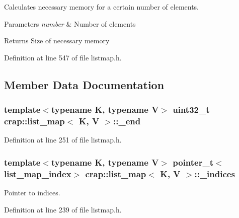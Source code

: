 Calculates necessary memory for a certain number of elements. 


\begin{DoxyParams}{Parameters}
{\em number} & Number of elements \\
\hline
\end{DoxyParams}
\begin{DoxyReturn}{Returns}
Size of necessary memory 
\end{DoxyReturn}


Definition at line 547 of file listmap.\+h.



\subsection{Member Data Documentation}
\hypertarget{classcrap_1_1list__map_afa98ab282df5241b186bba9087f694cf}{
\subsubsection[{\+\_\+end}]{\setlength{\rightskip}{0pt plus 5cm}template$<$typename K, typename V$>$ uint32\+\_\+t {\bf crap\+::list\+\_\+map}$<$ K, V $>$\+::\+\_\+end\hspace{0.3cm}{\ttfamily [protected]}}}\label{classcrap_1_1list__map_afa98ab282df5241b186bba9087f694cf}


Definition at line 251 of file listmap.\+h.

\hypertarget{classcrap_1_1list__map_a3adb0e770ab21d2634db1fd04afffb27}{
\subsubsection[{\+\_\+indices}]{\setlength{\rightskip}{0pt plus 5cm}template$<$typename K, typename V$>$ {\bf pointer\+\_\+t}$<${\bf list\+\_\+map\+\_\+index}$>$ {\bf crap\+::list\+\_\+map}$<$ K, V $>$\+::\+\_\+indices\hspace{0.3cm}{\ttfamily [protected]}}}\label{classcrap_1_1list__map_a3adb0e770ab21d2634db1fd04afffb27}


Pointer to indices. 



Definition at line 239 of file listmap.\+h.

